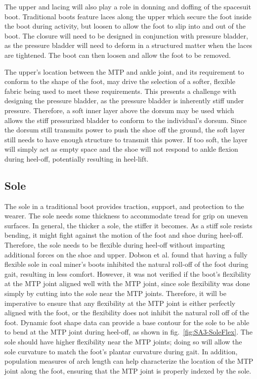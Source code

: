 \documentclass[defaultstyle,11pt]{comps}
\begin{document}
The upper and lacing will also play a role in donning and doffing of the spacesuit boot.
Traditional boots feature laces along the upper which secure the foot inside the boot during activity, but loosen to allow the foot to slip into and out of the boot.
The closure will need to be designed in conjunction with pressure bladder, as the pressure bladder will need to deform in a structured matter when the laces are tightened.
The boot can then loosen and allow the foot to be removed.

The upper's location between the MTP and ankle joint, and its requirement to conform to the shape of the foot, may drive the selection of a softer, flexible fabric being used to meet these requirements.
This presents a challenge with designing the pressure bladder, as the pressure bladder is inherently stiff under pressure.
Therefore, a soft inner layer above the dorsum may be used which allows the stiff pressurized bladder to conform to the individual's dorsum.
Since the dorsum still transmits power to push the shoe off the ground, the soft layer still needs to have enough structure to transmit this power.
If too soft, the layer will simply act as empty space and the shoe will not respond to ankle flexion during heel-off, potentially resulting in heel-lift.

\hypertarget{sole}{%
\subsection{Sole}\label{sole}}

The sole in a traditional boot provides traction, support, and protection to the wearer.
The sole needs some thickness to accommodate tread for grip on uneven surfaces.
In general, the thicker a sole, the stiffer it becomes.
As a stiff sole resists bending, it might fight against the motion of the foot and shoe during heel-off.
Therefore, the sole needs to be flexible during heel-off without imparting additional forces on the shoe and upper.
Dobson et al. \citep{Dobson2020} found that having a fully flexible sole in coal miner's boots inhibited the natural roll-off of the foot during gait, resulting in less comfort.
However, it was not verified if the boot's flexibility at the MTP joint aligned well with the MTP joint, since sole flexibility was done simply by cutting into the sole near the MTP joints.
Therefore, it will be imperative to ensure that any flexibility at the MTP joint is either perfectly aligned with the foot, or the flexibility does not inhibit the natural roll off of the foot.
Dynamic foot shape data can provide a base contour for the sole to be able to bend at the MTP joint during heel-off, as shown in fig.~\ref{fig:SA3-SoleFlex}.
The sole should have higher flexibility near the MTP joints; doing so will allow the sole curvature to match the foot's plantar curvature during gait.
In addition, population measures of arch length can help characterize the location of the MTP joint along the foot, ensuring that the MTP joint is properly indexed by the sole.
\end{document}
